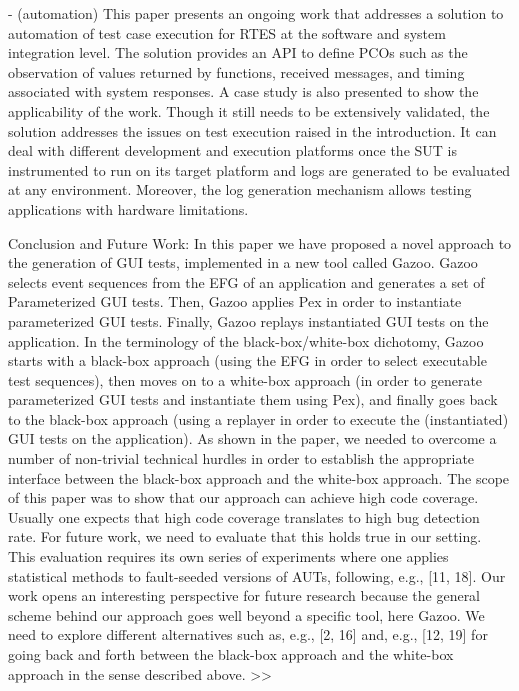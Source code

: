 \documentclass[runningheads,a4paper]{llncs}
\begin{document}
- (automation) This paper presents an ongoing work that addresses a solution to automation of
test case execution for RTES at the software and system integration level. The solution
provides an API to define PCOs such as the observation of values returned by functions, 
received messages, and timing associated with system responses.
A case study is also presented to show the applicability of the work. Though it
still needs to be extensively validated, the solution addresses the issues on test
execution raised in the introduction. It can deal with different development and
execution platforms once the SUT is instrumented to run on its target platform
and logs are generated to be evaluated at any environment. Moreover, the log
generation mechanism allows testing applications with hardware limitations.

Conclusion and Future Work: In this paper we have proposed a novel approach to the generation of 
GUI tests, implemented in a new tool called Gazoo. Gazoo selects event sequences
from the EFG of an application and generates a set of Parameterized GUI tests.
Then, Gazoo applies Pex in order to instantiate parameterized GUI tests. Finally,
Gazoo replays instantiated GUI tests on the application. In the terminology of
the black-box/white-box dichotomy, Gazoo starts with a black-box approach
(using the EFG in order to select executable test sequences), then moves on to a
white-box approach (in order to generate parameterized GUI tests and instantiate
them using Pex), and finally goes back to the black-box approach (using
a replayer in order to execute the (instantiated) GUI tests on the application).
As shown in the paper, we needed to overcome a number of non-trivial technical
hurdles in order to establish the appropriate interface between the black-box
approach and the white-box approach.
The scope of this paper was to show that our approach can achieve high
code coverage. Usually one expects that high code coverage translates to high
bug detection rate. For future work, we need to evaluate that this holds true
in our setting. This evaluation requires its own series of experiments where one
applies statistical methods to fault-seeded versions of AUTs, following, e.g., [11,
18].
Our work opens an interesting perspective for future research because the
general scheme behind our approach goes well beyond a specific tool, here Gazoo.
We need to explore different alternatives such as, e.g., [2, 16] and, e.g., [12, 19]
for going back and forth between the black-box approach and the white-box
approach in the sense described above.
>>
\end{document}
